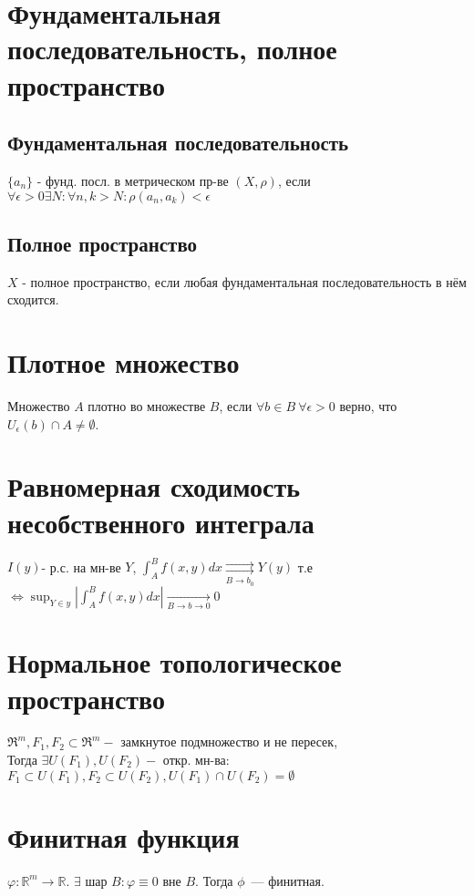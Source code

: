 \documentclass[paper=a4, fontsize=14pt]{report}
\begin{document}
\section{Фундаментальная последовательность, полное пространство}
\subsection{Фундаментальная последовательность}
$\{a_n\}$ - фунд. посл. в метрическом пр-ве $(X, \rho)$, если $\forall \epsilon > 0 \exists N: \forall n, k > N: \rho(a_n, a_k) < \epsilon$

\subsection{Полное пространство}
$X$ - полное пространство, если любая фундаментальная последовательность в нём сходится.

\section{Плотное множество}
Множество $A$ плотно во множестве $B$, если $\forall b \in B \ \forall \epsilon > 0$ верно, что $U_\epsilon(b) \cap A \neq \emptyset$.

\section{Равномерная сходимость несобственного интеграла}
    $I(y)$- р.с. на мн-ве $Y$, $\int_A^B f(x,y) dx \underset{B \to b_0}{\rightrightarrows}  Y(y)$ т.е \newline $\Leftrightarrow \sup_{Y \in y} |\int_A^B f(x,y) dx| \underset{B \rightarrow b \to 0}{\rightarrow} 0$

    \section{Нормальное топологическое пространство}
    $\Re^m, F_1,F_2 \subset \Re^m -$ замкнутое подмножество и не пересек, \\
    Тогда  $\exists U(F_1), U(F_2) -$ откр. мн-ва: $F_1 \subset U(F_1), F_2 \subset U(F_2), U(F_1) \cap U(F_2) = \emptyset$

    \section{Финитная функция}
    $\varphi : \mathbb{R}^m \rightarrow \mathbb{R}$. $\exists$ шар $B: \varphi \equiv 0 $ вне $B$. Тогда $\phi$~--- финитная.
\end{document}
